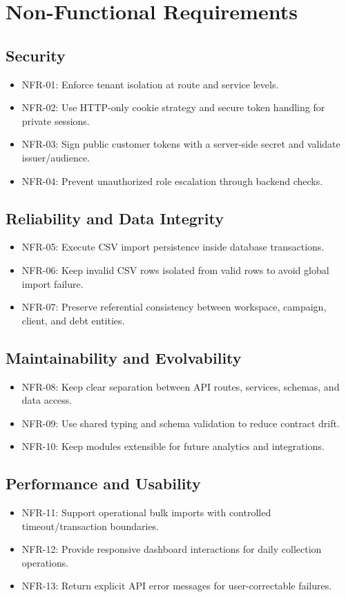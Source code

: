 \section{Non-Functional Requirements}
\subsection{Security}
\begin{itemize}
  \item NFR-01: Enforce tenant isolation at route and service levels.
  \item NFR-02: Use HTTP-only cookie strategy and secure token handling for private sessions.
  \item NFR-03: Sign public customer tokens with a server-side secret and validate issuer/audience.
  \item NFR-04: Prevent unauthorized role escalation through backend checks.
\end{itemize}

\subsection{Reliability and Data Integrity}
\begin{itemize}
  \item NFR-05: Execute CSV import persistence inside database transactions.
  \item NFR-06: Keep invalid CSV rows isolated from valid rows to avoid global import failure.
  \item NFR-07: Preserve referential consistency between workspace, campaign, client, and debt entities.
\end{itemize}

\subsection{Maintainability and Evolvability}
\begin{itemize}
  \item NFR-08: Keep clear separation between API routes, services, schemas, and data access.
  \item NFR-09: Use shared typing and schema validation to reduce contract drift.
  \item NFR-10: Keep modules extensible for future analytics and integrations.
\end{itemize}

\subsection{Performance and Usability}
\begin{itemize}
  \item NFR-11: Support operational bulk imports with controlled timeout/transaction boundaries.
  \item NFR-12: Provide responsive dashboard interactions for daily collection operations.
  \item NFR-13: Return explicit API error messages for user-correctable failures.
\end{itemize}

